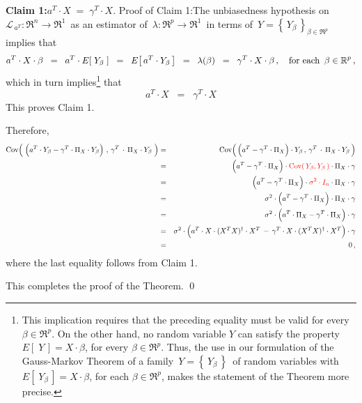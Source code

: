 \begin{enumerate}
	\vskip 0.5cm
	\noindent
	\textbf{Claim 1:}\quad $a^{T} \cdot X \; = \; \gamma^{T} \cdot X$.
	\vskip 0.0cm
	\noindent
	Proof of Claim 1:\quad The unbiasedness hypothesis on
	\,$\mathcal{L}_{\,a^{T}} : \Re^{n} \longrightarrow \Re^{1}$\,
	as an estimator of
	\,$\lambda : \Re^{p} \longrightarrow \Re^{1}$\,
	in terms of \,$Y = \left\{\,Y_{\beta}\,\right\}_{\beta\in\Re^{p}}$\,
	implies that
	\begin{equation*}
	a^{T} \cdot X \cdot \beta
	\;\; = \;\;
		a^{T} \cdot E\!\left[\;Y_{\beta}\;\right]
	\;\; = \;\;
		E\!\left[\,a^{T} \cdot Y_{\beta}\,\right]
	\;\; = \;\;
		\lambda(\beta)
	\;\; = \;\;
		\gamma^{T} \cdot X \cdot \beta\,,
	\quad
	\textnormal{for each \,$\beta \in \Re^{p}$}\,,
	\end{equation*}
	which in turn implies{\color{red}\footnote{\color{red}This implication
	requires that the preceding equality must be valid
	for every $\beta \in \Re^{p}$.
	On the other hand, no random variable $Y$ can satisfy the property
	$E\!\left[\;Y\,\right] = X \cdot \beta$, for every $\beta \in \Re^{p}$.
	Thus, the use in our formulation of the Gauss-Markov Theorem
	of a family \,$Y = \left\{\,Y_{\beta}\,\right\}$\, of random variables
	with $E\!\left[\;Y_{\beta}\,\right] = X \cdot \beta$, for each $\beta \in \Re^{p}$,
	makes the statement of the Theorem more precise.}}
	that
	\begin{equation*}
	a^{T} \cdot X
	\;\; = \;\;
		\gamma^{T} \cdot X
	\end{equation*}
	This proves Claim 1.
	
	\vskip 0.3cm
	\noindent
	Therefore,
	\begin{eqnarray*}
	\Cov\!\left(\;
		\left(a^{T} \cdot Y_{\beta}
		\overset{{\color{white}.}}{-}
		\gamma^{T} \cdot \Pi_{X} \cdot Y_{\beta}\right)
		\,,\,
		\gamma^{T} \overset{{\color{white}+}}{\cdot} \Pi_{X} \cdot Y_{\beta}
		\;\right)
	&=&
		\Cov\!\left(\,
			\left(a^{T} \overset{{\color{white}.}}{-} \gamma^{T} \cdot \Pi_{X} \right) \cdot Y_{\beta}
			\,,\,
			\gamma^{T} \overset{{\color{white}+}}{\cdot} \Pi_{X} \cdot Y_{\beta}
			\,\right)
	\\
	&=&
		\left(a^{T} \overset{{\color{white}.}}{-} \gamma^{T} \cdot \Pi_{X} \right)
		\cdot {\color{red}\Cov\!\left(\,Y_{\beta},Y_{\beta}\,\right)} \cdot \Pi_{X} \cdot \gamma
	\\
	&=&
		\left(a^{T} \overset{{\color{white}.}}{-} \gamma^{T} \cdot \Pi_{X} \right)
		\cdot {\color{red}\sigma^{2} \cdot I_{n}} \cdot \Pi_{X} \cdot \gamma
	\\
	&=&
		\sigma^{2}
		\cdot
		\left(a^{T} \overset{{\color{white}.}}{-} \gamma^{T} \cdot \Pi_{X} \right)
		\cdot \Pi_{X} \cdot \gamma
	\\
	&=&
		\sigma^{2}
		\cdot
		\left(a^{T} \cdot \Pi_{X} \overset{{\color{white}.}}{-} \gamma^{T} \cdot \Pi_{X} \right)
		\cdot \gamma
	\\
	&=&
		\sigma^{2}
		\cdot
		\left(a^{T} \cdot X\cdot(X^{T}X)^{\dagger}\cdot X^{T}
		\,\overset{{\color{white}.}}{-}\,
		\gamma^{T} \cdot X\cdot(X^{T}X)^{\dagger}\cdot X^{T} \right)
		\cdot \gamma
	\\
	&=&
		0\,,
	\end{eqnarray*}
	where the last equality follows from Claim 1.
\end{enumerate}
This completes the proof of the Theorem.
\qed


